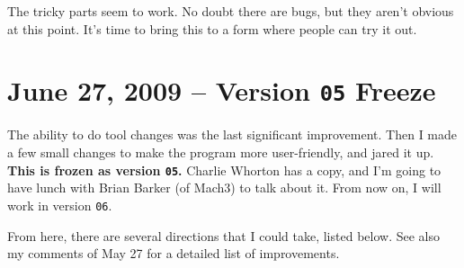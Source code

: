 \documentclass[titlepage,oneside,10pt]{article}
\begin{document}
The tricky parts seem to work. No doubt there are bugs, but they
aren't obvious at this point. It's time to bring this to a form where
people can try it out.

\section{June 27, 2009 -- Version {\tt 05} Freeze}

The ability to do tool changes was the last significant
improvement. Then I made a few small changes to make the program more
user-friendly, and jared it up. {\bf This is frozen as version 
{\tt 05}.} Charlie Whorton has a copy, and I'm going to have lunch
with Brian Barker (of Mach3) to talk about it. From now on, I will
work in version {\tt 06}.

From here, there are several directions that I could take, listed
below. See also my comments of May 27 for a detailed list of improvements.
\end{document}
